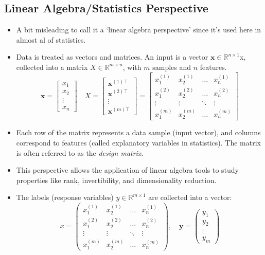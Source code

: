 \subsection{Linear Algebra/Statistics Perspective}
\begin{itemize}
    \item A bit misleading to call it a `linear algebra perspective' since it's used here in almost al of statistics.
    \item Data is treated as vectors and matrices. An input is a vector $\bm{x} \in \mathbb{R}^{n \times 1}$x, collected into a matrix $X \in \mathbb{R}^{m \times n}$, with $m$ samples and $n$ features.
          \[
              \bm{x} = \begin{bmatrix}
                  x_1 \\ x_2 \\ \vdots \\ x_n
              \end{bmatrix} \quad X = \begin{bmatrix}
                  \bm{x}^{(1)\top} \\ \bm{x}^{(2)\top} \\ \vdots \\ \bm{x}^{(m)\top}
              \end{bmatrix} = \begin{bmatrix}
                  x_1^{(1)} & x_2^{(1)} & \dots  & x_n^{(1)} \\
                  x_1^{(2)} & x_2^{(2)} & \dots  & x_n^{(2)} \\
                  \vdots    & \vdots    & \ddots & \vdots    \\
                  x_1^{(m)} & x_2^{(m)} & \dots  & x_n^{(m)}
              \end{bmatrix}
          \]
    \item Each row of the matrix represents a data sample (input vector), and columns correspond to features (called explanatory variables in statistics). The matrix is often referred to as the \textit{design matrix}.
    \item This perspective allows the application of linear algebra tools to study properties like rank, invertibility, and dimensionality reduction.
    \item The labels (response variables) $y \in \mathbb{R}^{m \times 1}$ are collected into a vector:
          \[
              x = \begin{pmatrix}
                  x_1^{(1)} & x_2^{(1)} & \dots  & x_n^{(1)} \\
                  x_1^{(2)} & x_2^{(2)} & \dots  & x_n^{(2)} \\
                  \vdots    & \vdots    & \ddots & \vdots    \\
                  x_1^{(m)} & x_2^{(m)} & \dots  & x_n^{(m)}
              \end{pmatrix}, \quad \mathbf{y} = \begin{pmatrix}
                  y_1 \\ y_2 \\ \vdots \\ y_m
              \end{pmatrix}
          \]
\end{itemize}

